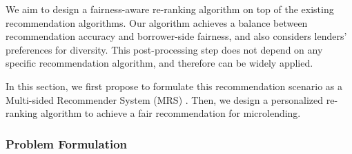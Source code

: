 We aim to design a fairness-aware re-ranking algorithm on top of the existing recommendation algorithms. Our algorithm achieves a balance between recommendation accuracy and borrower-side fairness, and also considers lenders' preferences for diversity. This post-processing step does not depend on any specific recommendation algorithm, and therefore can be widely applied.


In this section, we first propose to formulate this recommendation scenario as a Multi-sided Recommender System (MRS) \cite{burke2017multisided, burke2017patterns}.  Then, we design a personalized re-ranking algorithm to achieve a fair recommendation for microlending.


\subsubsection{\textbf{Problem Formulation}}
\hfill


